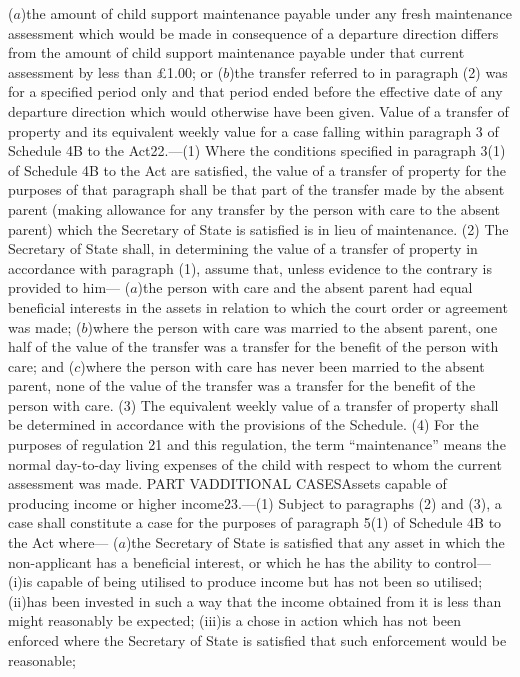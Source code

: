 \documentclass[a4paper]{article}
\begin{document}
($a$)the amount of child support maintenance payable under any fresh maintenance
assessment which would be made in consequence of a departure direction differs
from the amount of child support maintenance payable under that current
assessment by less than £1.00; or
($b$)the transfer referred to in paragraph (2) was for a specified period only and
that period ended before the effective date of any departure direction which
would otherwise have been given.
Value of a transfer of property and its equivalent weekly value for a case
falling within paragraph 3 of Schedule 4B to the Act22.—(1) Where the conditions
specified in paragraph 3(1) of Schedule 4B to the Act are satisfied, the value
of a transfer of property for the purposes of that paragraph shall be that part
of the transfer made by the absent parent (making allowance for any transfer by
the person with care to the absent parent) which the Secretary of State is
satisfied is in lieu of maintenance.
(2) The Secretary of State shall, in determining the value of a transfer of
property in accordance with paragraph (1), assume that, unless evidence to the
contrary is provided to him—
($a$)the person with care and the absent parent had equal beneficial interests in
the assets in relation to which the court order or agreement was made;
($b$)where the person with care was married to the absent parent, one half of the
value of the transfer was a transfer for the benefit of the person with care;
and
($c$)where the person with care has never been married to the absent parent, none
of the value of the transfer was a transfer for the benefit of the person with
care.
(3) The equivalent weekly value of a transfer of property shall be determined in
accordance with the provisions of the Schedule.
(4) For the purposes of regulation 21 and this regulation, the term
“maintenance” means the normal day-to-day living expenses of the child with
respect to whom the current assessment was made.
PART VADDITIONAL CASESAssets capable of producing income or higher income23.—(1)
Subject to paragraphs (2) and (3), a case shall constitute a case for the
purposes of paragraph 5(1) of Schedule 4B to the Act where—
($a$)the Secretary of State is satisfied that any asset in which the non-applicant
has a beneficial interest, or which he has the ability to control—
(i)is capable of being utilised to produce income but has not been so utilised;
(ii)has been invested in such a way that the income obtained from it is less
than might reasonably be expected;
(iii)is a chose in action which has not been enforced where the Secretary of
State is satisfied that such enforcement would be reasonable;
\end{document}
